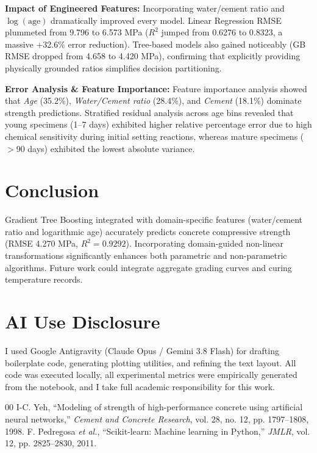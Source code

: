 \documentclass[conference]{IEEEtran}
\begin{document}
\textbf{Impact of Engineered Features:} Incorporating water/cement ratio and $\log(\text{age})$ dramatically improved every model. Linear Regression RMSE plummeted from 9.796 to 6.573 MPa ($R^2$ jumped from 0.6276 to 0.8323, a massive +32.6\% error reduction). Tree-based models also gained noticeably (GB RMSE dropped from 4.658 to 4.420 MPa), confirming that explicitly providing physically grounded ratios simplifies decision partitioning.

\textbf{Error Analysis \& Feature Importance:} Feature importance analysis showed that \textit{Age} (35.2\%), \textit{Water/Cement ratio} (28.4\%), and \textit{Cement} (18.1\%) dominate strength predictions. Stratified residual analysis across age bins revealed that young specimens (1--7 days) exhibited higher relative percentage error due to high chemical sensitivity during initial setting reactions, whereas mature specimens ($>90$ days) exhibited the lowest absolute variance.

\section{Conclusion}
Gradient Tree Boosting integrated with domain-specific features (water/cement ratio and logarithmic age) accurately predicts concrete compressive strength (RMSE 4.270 MPa, $R^2 = 0.9292$). Incorporating domain-guided non-linear transformations significantly enhances both parametric and non-parametric algorithms. Future work could integrate aggregate grading curves and curing temperature records.

\section*{AI Use Disclosure}
I used Google Antigravity (Claude Opus / Gemini 3.8 Flash) for drafting boilerplate code, generating plotting utilities, and refining the text layout. All code was executed locally, all experimental metrics were empirically generated from the notebook, and I take full academic responsibility for this work.

\begin{thebibliography}{00}
 I-C. Yeh, ``Modeling of strength of high-performance concrete using artificial neural networks,'' \textit{Cement and Concrete Research}, vol. 28, no. 12, pp. 1797--1808, 1998.
 F. Pedregosa \textit{et al.}, ``Scikit-learn: Machine learning in Python,'' \textit{JMLR}, vol. 12, pp. 2825--2830, 2011.
\end{thebibliography}
\end{document}
